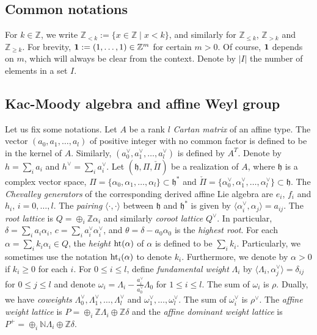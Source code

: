 \documentclass[11pt]{amsart}
\theoremstyle{plain}
\numberwithin{equation}{subsection}
\begin{document}
\subsection{Common notations}

For $k\in \mathbb{Z}$, we write
$\mathbb{Z}_{<k}:=\{x\in\mathbb{Z}\mid x<k\}$,
and similarly for $\mathbb{Z}_{\leq k}$, $\mathbb{Z}_{>k}$ and $\mathbb{Z}_{\geq k}$.
For brevity, ${\bf 1}:=(1,\dots,1)\in \mathbb{Z}^m$ for certain $m>0$.
Of course, $\bf 1$ depends on $m$, which will always be clear from the context.
Denote by $|I|$ the number of elements in a set $I$.



\subsection{Kac-Moody algebra and affine Weyl group}

Let us fix some notations. Let $A$ be a rank $l$ {\em Cartan matrix} of an affine type.
The vector $(a_0, a_1, \dots, a_l)$ of positive integer with no common factor is defined to be in the kernel of $A$.
Similarly, $(a_0^{\vee}, a_1^{\vee}, \dots, a_l^{\vee})$ is defined by $A^T$. 
Denote by $h=\sum_i a_i$ and $h^\vee=\sum_i a_i^\vee$.
Let $(\mathfrak{h}, \Pi, \check\Pi)$ be a realization of $A$, where $\mathfrak{h}$ is a complex vector space, 
$\Pi=\{\alpha_0, \alpha_1, \dots, \alpha_l\}\subset \mathfrak{h}^*$ 
and $\check\Pi=\{\alpha_0^\vee, \alpha_1^\vee, \dots, \alpha_l^\vee\}\subset \mathfrak{h}$.
The {\em Chevalley generators} of the corresponding derived affine Lie algebra are $e_i$, $f_i$ and $h_i$, $i=0, \dots, l$.
The {\em pairing} $\langle\cdot,\cdot\rangle$ between $\mathfrak{h}$ 
and $\mathfrak{h}^*$ is given by $\langle \alpha_i^\vee, \alpha_j\rangle=a_{ij}$.
The {\em root lattice} is $Q=\oplus_i\mathbb{Z}\alpha_i$ and similarly {\em coroot lattice} $Q^\vee$. 
In particular, $\delta=\sum_ia_i\alpha_i$, $c=\sum_ia_i^\vee\alpha_i^\vee$, and $\theta=\delta-a_0\alpha_0$ is the {\em highest root}.
For each $\alpha=\sum_ik_i\alpha_i\in Q$, the {\em height} ${\rm ht}(\alpha)$ of $\alpha$ is defined to be $\sum_ik_i$. 
Particularly, we sometimes use the notation ${\rm ht}_i(\alpha)$ to denote $k_i$.
Furthermore, we denote by $\alpha>0$ if $k_i\geq 0$ for each $i$.
For $0\leq i\leq l$, define {\em fundamental weight} $\Lambda_i$ by $\langle\Lambda_i, \alpha_j^\vee\rangle=\delta_{ij}$ for $0\leq j\leq l$
and denote $\omega_i=\Lambda_i-\frac{a_i^\vee}{a_0^\vee}\Lambda_0$ for $1\leq i\leq l$. The sum of $\omega_i$ is $\rho$. 
Dually, we have {\em coweights} $\Lambda_0^\vee, \Lambda_1^\vee, \dots, \Lambda_l^\vee$ and $\omega_1^\vee, \dots, \omega_l^\vee$.
The sum of $\omega_i^\vee$ is $\rho^\vee$. The {\em affine weight lattice} is $P=\oplus_i\mathbb{Z}\Lambda_i\oplus \mathbb{Z}\delta$
and the {\em affine dominant weight lattice} is $P^+=\oplus_i\mathbb{N}\Lambda_i\oplus \mathbb{Z}\delta$.
\end{document}
